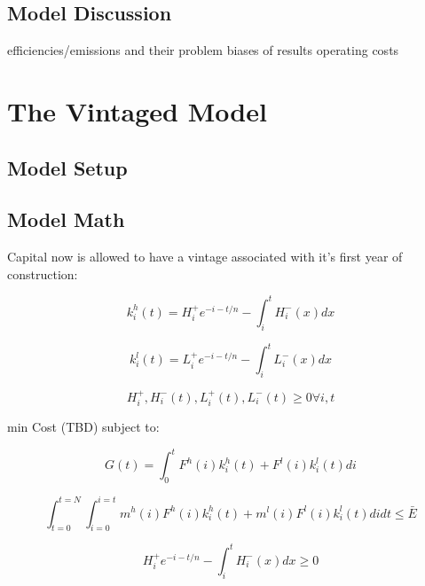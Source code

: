 \documentclass[singlespace]{easychithesis}
\begin{document}
\section{Model Discussion}

efficiencies/emissions and their problem
biases of results
operating costs 





\chapter{The Vintaged Model}
\section{Model Setup}

\section{Model Math}

Capital now is allowed to have a vintage associated with it's first year of construction:

\begin{equation}
k_i^h(t) = H_i^+ e^{-i-t/n} - \int_i^t H^-_i(x)dx
\end{equation}

\begin{equation}
k_i^l(t) = L_i^+ e^{-i-t/n} - \int_i^t L^-_i(x)dx
\end{equation}

\begin{equation}
H^+_i, H^-_i(t), L^+_i(t), L^-_i(t) \geq 0 \forall i, t
\end{equation}

min Cost (TBD) subject to:

\begin{equation}
G(t) = \int_0^t F^h(i)k_i^h(t) + F^l(i)k_i^l(t) di
\end{equation}

\begin{equation}
\int_{t=0}^{t=N}\int_{i=0}^{i=t} m^h(i)F^h(i)k_i^h(t) + m^l(i)F^l(i)k_i^l(t) di dt \leq \bar{E}
\end{equation}

\begin{equation}
H_i^+ e^{-i-t/n} - \int_i^t H^-_i(x)dx \geq 0
\end{equation}
\end{document}
